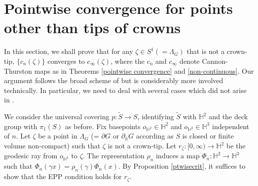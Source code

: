 \documentclass{amsart}
\theoremstyle{definition}
\newcommand{\naturals}{\mathbb{N}}
\newcommand\HHH{{\mathbb H}}
\begin{document}
\section{Pointwise convergence for points other than tips of crowns}\label{noncrown}
In this section, we shall prove that for any $\zeta \in S^1 (= \Lambda_G)$ that is not a crown-tip, 
$\{c_n (\zeta)\}$ converges to $c_\infty (\zeta)$, where the $c_n$ and $c_\infty$ denote  Cannon-Thurston maps as in Theorems \ref{pointwise convergence} and \ref{non-continuous}.
Our argument follows the broad scheme of   \cite[Section 5.5]{mahan-series2} but  is considerably more involved technically. In particular, we need to deal with several cases which did not arise in  \cite{mahan-series2}.

We consider the universal covering $p: \widetilde S\rightarrow S$, identifying $\widetilde S$ with $\HHH^2$ and the deck group with $\pi_1(S)$ as before.
Fix  basepoints $o_{\HHH^2} \in \HHH^2$ and $o_{\HHH^3} \in \HHH^3$ independent of $n$.
Let $\zeta$ be a point in $\Lambda_{G}$ (= $\partial G$ or $\partial_h G$ according as $S$ is closed or finite volume non-compact) such that $\zeta$ is not a crown-tip.
Let $r_\zeta: [0,\infty) \rightarrow \HHH^2$ be the geodesic ray from $o_{\HHH^2}$  to $\zeta$.
The representation $\rho_n$ induces a map  $\Phi_n: \HHH^2 \rightarrow \HHH^3$ such that $\Phi_n(\gamma x)=\rho_n(\gamma) \Phi_n(x)$.
By Proposition \ref{ptwisecrit}, it suffices   to show that the EPP condition  holds for $r_\zeta$.

\begin{comment}
\begin{specdef}[EPP condition]
\label{EPP}
There are functions $f_\zeta: [0,\infty) \rightarrow [0,\infty)$ with $f_\zeta(t) \rightarrow \infty$ as $t \rightarrow \infty$ and $M_\zeta: \naturals \rightarrow \naturals$ both depending on $n$ such that for any $N \in [0,\infty)$ and $s, t \geq N$, the geodesic arc in $\HHH^3$ connecting  $\Phi_n \circ r_\zeta (s_1)$ with $\Phi_n \circ r_\zeta(s_2)$ lies outside the $f_\zeta(N)$-ball centred at $o_{\HHH^3}$ for any  $n \geq M_\zeta(N)$.
\end{specdef}
\end{comment}
\end{document}
